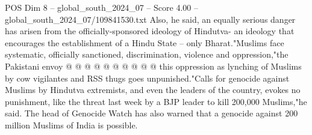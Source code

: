 \begin{textsample}{POS Dim 8 – global\_south\_2024\_07 – Score 4.00 – global\_south\_2024\_07/109841530.txt}
Also, he said, an equally serious danger has arisen from the officially-sponsored ideology of Hindutva- an ideology that encourages the establishment of a Hindu State -- only Bharat."Muslims face systematic, officially sanctioned, discrimination, violence and oppression,"the Pakistani envoy @ @ @ @ @ @ @ @ @ @ this oppression as lynching of Muslims by cow vigilantes and RSS thugs goes unpunished."Calls for genocide against Muslims by Hindutva extremists, and even the leaders of the country, evokes no punishment, like the threat last week by a BJP leader to kill 200,000 Muslims,"he said.
The head of Genocide Watch has also warned that a genocide against 200 million Muslims of India is possible.

\end{textsample}
